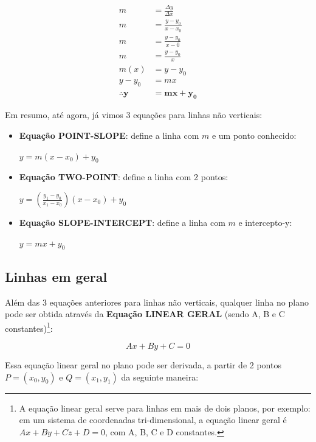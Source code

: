 \documentclass[pdftex, brazil, 12pt, twoside]{article}
\begin{document}
\begin{equation}
  \begin{split}
    m & = \frac{\Delta y}{\Delta x}\\
    m & = \frac{y - y_0}{x - x_0}\\
    m & = \frac{y - y_0}{x - 0}\\
    m & = \frac{y - y_0}{x}\\
    m(x) & = y - y_0\\
    y - y_0 & = mx\\
    \bm{\therefore y} & \bm{= mx + y_0}
  \end{split}
\end{equation}

Em resumo, até agora, já vimos 3 equações para linhas não verticais:

\begin{itemize}
\item \textbf{Equação POINT-SLOPE}: define a linha com $m$ e um ponto conhecido:

  $y = m(x - x_0) + y_0$
\item \textbf{Equação TWO-POINT}: define a linha com 2 pontos:

  $y = \left(\frac{y_1 - y_0}{x_1 - x_0}\right)(x - x_0) + y_0$
\item \textbf{Equação SLOPE-INTERCEPT}: define a linha com $m$ e intercepto-y:

  $y = mx + y_0$
\end{itemize}

\subsection{Linhas em geral}
\label{modelagem-linear-linhas-gerais}

Além das 3 equações anteriores para linhas não verticais, qualquer linha no
plano pode ser obtida através da \textbf{Equação LINEAR GERAL} (sendo A, B e C constantes)\footnote{A equação
  linear geral serve para linhas em mais de dois planos, por exemplo: em um sistema de coordenadas
  tri-dimensional, a equação linear geral é $Ax + By + Cz + D = 0$, com A, B, C e D constantes.}:

\begin{equation}
  Ax + By + C = 0
\end{equation}

Essa equação linear geral no plano pode ser derivada,
a partir de 2 pontos $P=(x_0, y_0)$ e $Q=(x_1, y_1)$ da seguinte maneira:
\end{document}
